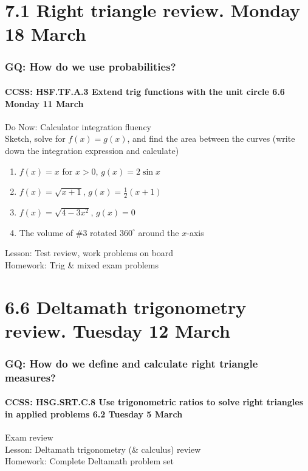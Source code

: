 \documentclass{beamer}
\begin{document}
\section{7.1 Right triangle review. Monday 18 March}
  \frame
  {
    \frametitle{GQ: How do we use probabilities?}
    \framesubtitle{CCSS: HSF.TF.A.3 Extend trig functions with the unit circle  \hfill \alert{6.6 Monday 11 March}}

    \begin{block}{Do Now: Calculator integration fluency\\
      Sketch, solve for $f(x)=g(x)$, and find the area between the curves (write down the integration expression and calculate)}
      \begin{enumerate}
        \item $f(x)=x$ for $x>0$, $g(x)=2 \sin x$
        \item $f(x)=\sqrt{x+1}$, $g(x)=\frac{1}{2}(x+1)$
        \item $f(x)=\sqrt{4-3x^2}$, $g(x)=0$
        \item The volume of \#3 rotated $360^\circ$ around the $x$-axis
      \end{enumerate}
      \end{block}
    Lesson: Test review, work problems on board\\%
    Homework: Trig \& mixed exam problems
  }

\section{6.6 Deltamath trigonometry review. Tuesday 12 March}
  \frame
  {
    \frametitle{GQ: How do we define and calculate right triangle measures?}
    \framesubtitle{CCSS: HSG.SRT.C.8 Use trigonometric ratios to solve right triangles in applied problems \hfill \alert{6.2 Tuesday 5 March}}

    Exam review\\
    Lesson: Deltamath trigonometry (\& calculus) review\\
    Homework: Complete Deltamath problem set
  }
\end{document}
